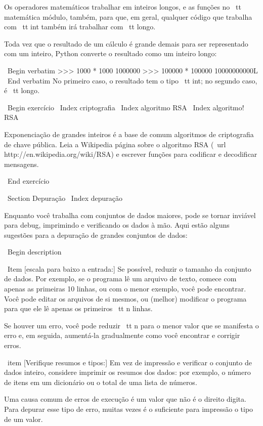 \documentclass[10pt]{book}
\begin{document}
\begin {itemize}
{{{{{{{Os operadores matemáticos trabalhar em inteiros longos, e as funções
no {\ tt matemática} módulo, também, para que, em geral, qualquer código que
trabalha com {\ tt int} também irá trabalhar com {\ tt longo}.

Toda vez que o resultado de um cálculo é grande demais para ser representado com
um inteiro, Python converte o resultado como um inteiro longo:

\ Begin {verbatim}
>>> 1000 * 1000
1000000
>>> 100000 * 100000
10000000000L
\ End {verbatim}
%
No primeiro caso, o resultado tem o tipo {\ tt int}; no
segundo caso, é {\ tt longo}.

\ Begin {} exercício
\ Index {} criptografia
\ Index {algoritmo RSA}
\ Index {algoritmo! RSA}

Exponenciação de grandes inteiros é a base de comum
algoritmos de criptografia de chave pública. Leia a Wikipedia
página sobre o algoritmo RSA (\ url {http://en.wikipedia.org/wiki/RSA})
e escrever funções para codificar e decodificar mensagens.


\ End {} exercício


\ Section {} Depuração
\ Index {depuração}

Enquanto você trabalha com conjuntos de dados maiores, pode se tornar inviável para
debug, imprimindo e verificando os dados à mão. Aqui estão alguns
sugestões para a depuração de grandes conjuntos de dados:

\ Begin {description}

\ Item [escala para baixo a entrada:] Se possível, reduzir o tamanho da
conjunto de dados. Por exemplo, se o programa lê um arquivo de texto, comece com
apenas as primeiras 10 linhas, ou com o menor exemplo, você pode encontrar.
Você pode editar os arquivos de si mesmos, ou (melhor) modificar o
programa para que ele lê apenas os primeiros {\ tt n} linhas.

Se houver um erro, você pode reduzir {\ tt n} para o menor
valor que se manifesta o erro e, em seguida, aumentá-la gradualmente
como você encontrar e corrigir erros.

\ item [Verifique resumos e tipos:] Em vez de impressão e verificar o
conjunto de dados inteiro, considere imprimir os resumos dos dados: por exemplo,
o número de itens em um dicionário ou o total de uma lista de números.

Uma causa comum de erros de execução é um valor que não é o direito
digita. Para depurar esse tipo de erro, muitas vezes é o suficiente para impressão
o tipo de um valor.

}}}}}}}
\end{itemize}
\end{document}
